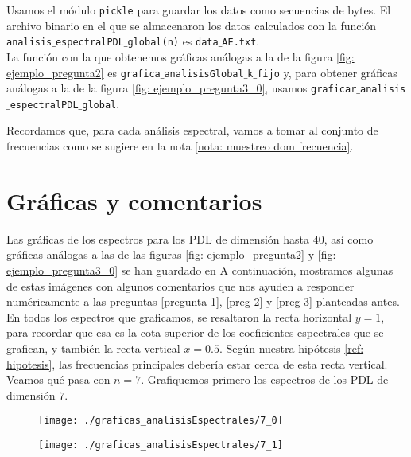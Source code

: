 Usamos el 
módulo \texttt{pickle} para guardar los datos como secuencias
de bytes. El archivo binario en el que se almacenaron los
datos calculados con la función 
\texttt{analisis$\_$espectralPDL$\_$global(n)}
es \texttt{data$\_$AE.txt}. \\

La función con la que obtenemos gráficas análogas 
a la de la figura 
\ref{fig: ejemplo_pregunta2} es
\texttt{grafica$\_$analisisGlobal$\_$k$\_$fijo}
y, para obtener gráficas análogas a la de la figura
\ref{fig: ejemplo_pregunta3_0},
usamos \texttt{graficar$\_$analisis$\_$espectralPDL$\_$global}.

Recordamos que,
para cada análisis espectral,
vamos a tomar al conjunto de 
frecuencias 
como se sugiere en la nota \ref{nota: muestreo dom frecuencia}.

\section{Gráficas y comentarios}
Las gráficas de los espectros
para los PDL de dimensión hasta $40$, así
como gráficas análogas a las de las figuras
\ref{fig: ejemplo_pregunta2}
y 
\ref{fig: ejemplo_pregunta3_0}
se han guardado en 
A continuación, mostramos algunas
de estas imágenes con algunos comentarios
que nos ayuden a responder numéricamente a 
las preguntas
\ref{pregunta 1}, \ref{preg 2} y \ref{preg 3}
planteadas antes. \\

En todos los espectros que graficamos,
se resaltaron la recta horizontal
$y = 1$, para recordar que esa es la cota
superior de los coeficientes espectrales que
se grafican, 
y también la recta vertical $x = 0.5$. Según nuestra
hipótesis \ref{ref: hipotesis}, las frecuencias
principales debería estar cerca de esta recta vertical. \\

Veamos qué pasa con $n=7$.
Grafiquemos primero los espectros
de los PDL de dimensión $7$.

\begin{figure}[H]
	\sidecaption{
	\label{fig: 7_0}
	}
	\centering
	\texttt{[image: ./graficas\_analisisEspectrales/7\_0]} 
\end{figure}	

\begin{figure}[H]
	\sidecaption{
	\label{fig: 7_1}
	}
	\centering
	\texttt{[image: ./graficas\_analisisEspectrales/7\_1]} 
\end{figure}	

